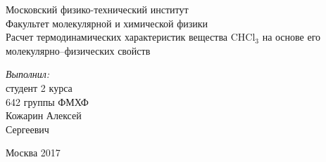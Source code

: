 \begin{titlepage}
\begin{center} 
 
\large Московский физико-технический институт\\
Факультет молекулярной и химической физики\\
\vspace{7cm}
\huge Расчет термодинамических характеристик вещества CHCl$_3$ на основе его молекулярно--физических свойств
\end{center} 

\vspace{7.5cm}
{\par \raggedleft \large \emph{Выполнил:}\\ студент 2 курса\\ 642 группы ФМХФ\\ Кожарин Алексей\\ Сергеевич \par}
\begin{center}
\vfill Москва 2017
\end{center}
\end{titlepage}
\newpage
\setcounter{page}{2}